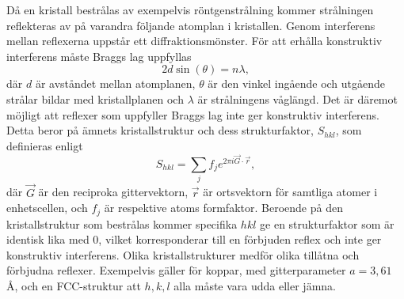 \documentclass[12pt, a4paper]{article}
\begin{document}
Då en kristall bestrålas av exempelvis röntgenstrålning kommer strålningen reflekteras av på varandra följande atomplan i kristallen. 
Genom interferens mellan reflexerna uppstår ett diffraktionsmönster. För att erhålla konstruktiv interferens måste Braggs lag uppfyllas
\begin{equation}
    2d\sin(\theta) = n\lambda,
    \label{Eq: Braggs lag}
\end{equation}
där $d$ är avståndet mellan atomplanen, $\theta$ är den vinkel ingående och utgående strålar bildar med kristallplanen och $\lambda$ är strålningens våglängd. Det är däremot möjligt att reflexer som uppfyller Braggs lag inte ger konstruktiv interferens. Detta beror på ämnets kristallstruktur och dess strukturfaktor, $S_{hkl}$, som definieras enligt
\begin{equation}
    S_{hkl} = \sum_j f_j e^{2\pi i \vec G \cdot \vec r},
\end{equation}
där $\vec G$ är den reciproka gittervektorn, $\vec r$ är ortsvektorn för samtliga atomer i enhetscellen, och $f_j$ är respektive atoms formfaktor. 
Beroende på den kristallstruktur som bestrålas kommer specifika $hkl$ ge en strukturfaktor som är identisk lika med 0, 
vilket korresponderar till en förbjuden reflex och inte ger konstruktiv interferens. 
Olika kristallstrukturer medför olika tillåtna och förbjudna reflexer. 
Exempelvis gäller för koppar, med gitterparameter $a=3,61$ Å, och en FCC-struktur att $h,k,l$ alla måste vara udda eller jämna\cite{Hofmann}.  
\end{document}
